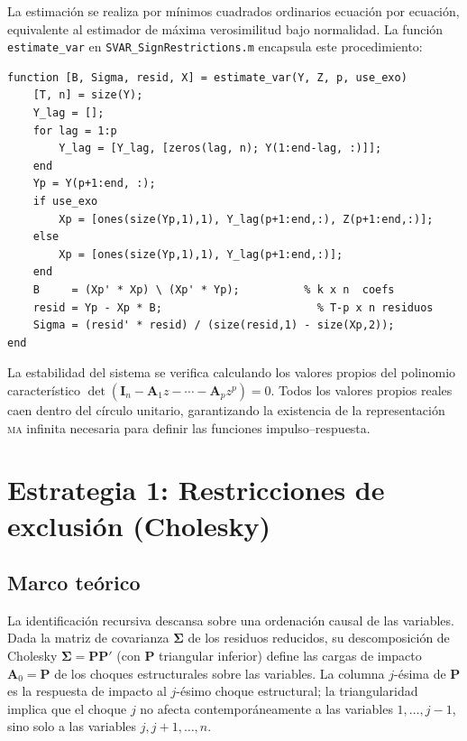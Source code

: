 \documentclass[11pt,letterpaper]{article}
\begin{document}
La estimación se realiza por mínimos cuadrados ordinarios ecuación por ecuación, equivalente al estimador de máxima verosimilitud bajo normalidad. La función \texttt{estimate\_var} en \texttt{SVAR\_SignRestrictions.m} encapsula este procedimiento:

\begin{lstlisting}[style=matlabstyle, caption={Estimación VAR por OLS multivariado}]
function [B, Sigma, resid, X] = estimate_var(Y, Z, p, use_exo)
    [T, n] = size(Y);
    Y_lag = [];
    for lag = 1:p
        Y_lag = [Y_lag, [zeros(lag, n); Y(1:end-lag, :)]];
    end
    Yp = Y(p+1:end, :);
    if use_exo
        Xp = [ones(size(Yp,1),1), Y_lag(p+1:end,:), Z(p+1:end,:)];
    else
        Xp = [ones(size(Yp,1),1), Y_lag(p+1:end,:)];
    end
    B     = (Xp' * Xp) \ (Xp' * Yp);          % k x n  coefs
    resid = Yp - Xp * B;                        % T-p x n residuos
    Sigma = (resid' * resid) / (size(resid,1) - size(Xp,2));
end
\end{lstlisting}

La estabilidad del sistema se verifica calculando los valores propios del polinomio característico $\det(\bm{I}_n - \bm{A}_1 z - \cdots - \bm{A}_p z^p) = 0$. Todos los valores propios reales caen dentro del círculo unitario, garantizando la existencia de la representación \textsc{ma} infinita necesaria para definir las funciones impulso--respuesta.

\section{Estrategia 1: Restricciones de exclusión (Cholesky)}\label{sec:cholesky}

\subsection{Marco teórico}

La identificación recursiva descansa sobre una ordenación causal de las variables. Dada la matriz de covarianza $\bm{\Sigma}$ de los residuos reducidos, su descomposición de Cholesky $\bm{\Sigma} = \bm{P}\bm{P}'$ (con $\bm{P}$ triangular inferior) define las cargas de impacto $\bm{A}_0 = \bm{P}$ de los choques estructurales sobre las variables. La columna $j$-ésima de $\bm{P}$ es la respuesta de impacto al $j$-ésimo choque estructural; la triangularidad implica que el choque $j$ no afecta contemporáneamente a las variables $1, \ldots, j-1$, sino solo a las variables $j, j+1, \ldots, n$.
\end{document}
